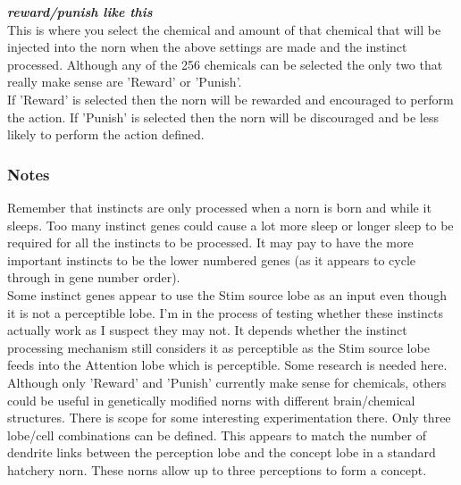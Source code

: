 \documentclass[11pt,twoside,a4paper]{article}
\begin{document}
\textbf{\textit{reward/punish like this}}~\\
This is where you select the chemical and amount of that chemical that will be injected into the norn when the above settings are made and the instinct processed. Although any of the 256 chemicals can be selected the only two that really make sense are 'Reward' or 'Punish'.~\\

If 'Reward' is selected then the norn will be rewarded and encouraged to perform the action. If 'Punish' is selected then the norn will be discouraged and be less likely to perform the action defined.

\subsubsection{Notes}

Remember that instincts are only processed when a norn is born and while it sleeps. Too many instinct genes could cause a lot more sleep or longer sleep to be required for all the instincts to be processed. It may pay to have the more important instincts to be the lower numbered genes (as it appears to cycle through in gene number order).~\\

Some instinct genes appear to use the Stim source lobe as an input even though it is not a perceptible lobe. I'm in the process of testing whether these instincts actually work as I suspect they may not. It depends whether the instinct processing mechanism still considers it as perceptible as the Stim source lobe feeds into the Attention lobe which is perceptible. Some research is needed here.~\\

Although only 'Reward' and 'Punish' currently make sense for chemicals, others could be useful in genetically modified norns with different brain/chemical structures. There is scope for some interesting experimentation there. Only three lobe/cell combinations can be defined. This appears to match the number of dendrite links between the perception lobe and the concept lobe in a standard hatchery norn. These norns allow up to three perceptions to form a concept.~\\


\end{document}
